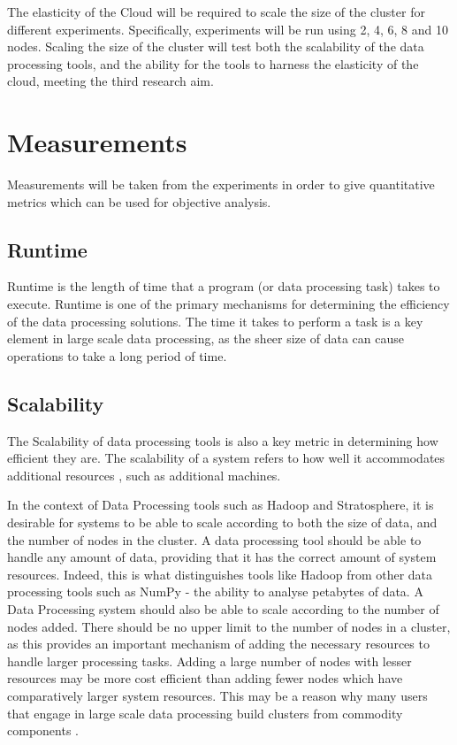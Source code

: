 The elasticity of the Cloud will be required to scale the size of the cluster for different experiments. Specifically, experiments will be run using 2, 4, 6, 8 and 10 nodes. Scaling the size of the cluster will test both the scalability of the data processing tools, and the ability for the tools to harness the elasticity of the cloud, meeting the third research aim.

\section{Measurements}
Measurements will be taken from the experiments in order to give quantitative metrics which can be used for objective analysis.  

\subsection{Runtime}
Runtime is the length of time that a program (or data processing task) takes to execute. Runtime is one of the primary mechanisms for determining the efficiency of the data processing solutions. The time it takes to perform a task is a key element in large scale data processing, as the sheer size of data can cause operations to take a long period of time. 

\subsection{Scalability}
The Scalability of data processing tools is also a key metric in determining how efficient they are. The scalability of a system refers to how well it accommodates additional resources \cite{bondi2000characteristics}, such as additional machines. 

In the context of Data Processing tools such as Hadoop and Stratosphere, it is desirable for systems to be able to scale according to both the size of data, and the number of nodes in the cluster. A data processing tool should be able to handle any amount of data, providing that it has the correct amount of system resources. Indeed, this is what distinguishes tools like Hadoop from other data processing tools such as NumPy \cite{numpy} - the ability to analyse petabytes of data. A Data Processing system should also be able to scale according to the number of nodes added. There should be no upper limit to the number of nodes in a cluster, as this provides an important mechanism of adding the necessary resources to handle larger processing tasks. Adding a large number of nodes with lesser resources may be more cost efficient than adding fewer nodes which have comparatively larger system resources. This may be a reason why many users that engage in large scale data processing build clusters from commodity components \cite{taylor2010overview}.  

